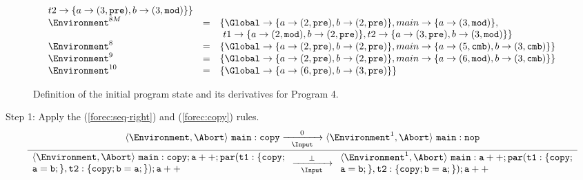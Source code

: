 \begin{figure}
$$\begin{array}{l l l}
									t2 \to \lbrace a \to (3, \mathtt{pre}), b \to (3, \mathtt{mod}) \rbrace
								\rbrace	\\
		\Environment^{8M}	&=& \lbrace
									\Global \to \lbrace a \to (2, \mathtt{pre}), b \to (2, \mathtt{pre}) \rbrace, 
									main \to \lbrace a \to (3, \mathtt{mod}) \rbrace,	\\
							& &	  ~ t1 \to \lbrace a \to (2, \mathtt{mod}), b \to (2, \mathtt{pre}) \rbrace,
									t2 \to \lbrace a \to (3, \mathtt{pre}), b \to (3, \mathtt{mod}) \rbrace
								\rbrace	\\
		\Environment^8		&=& \lbrace
									\Global \to \lbrace a \to (2, \mathtt{pre}), b \to (2, \mathtt{pre}) \rbrace, 
									main \to \lbrace a \to (5, \mathtt{cmb}), b \to (3, \mathtt{cmb}) \rbrace
								\rbrace	\\
		\Environment^9		&=& \lbrace
									\Global \to \lbrace a \to (2, \mathtt{pre}), b \to (2, \mathtt{pre}) \rbrace, 
									main \to \lbrace a \to (6, \mathtt{mod}), b \to (3, \mathtt{cmb}) \rbrace
								\rbrace	\\
		\Environment^{10}	&=& \lbrace
									\Global \to \lbrace a \to (6, \mathtt{pre}), b \to (3, \mathtt{pre}) \rbrace
								\rbrace	\\
	\end{array}$$
	
	\caption{Definition of the initial program state and its derivatives for Program 4.}
	\label{figure:forec_program_4}
\end{figure}

\noindent
Step 1: Apply the (\ref{forec:seq-right}) and (\ref{forec:copy}) rules. 
\begin{equation*}
	\frac{
			\langle \Environment, \Abort \rangle ~ \mathtt{main: copy}
				\xrightarrow[~~\Input~~]{0} 
			\langle \Environment^1, \Abort \rangle ~ \mathtt{main: nop}
		}{
			\begin{array}{l}
				\langle \Environment, \Abort \rangle ~ \mathtt{main: copy; a++; par(t1:\{copy;}	\\
				\mathtt{a=b;\},t2:\{copy; b=a;\}); a++}											\\
			\end{array}
				\xrightarrow[~~\Input~~]{\bot} 
			\begin{array}{l}
				\langle \Environment^1, \Abort \rangle ~ \mathtt{main: a++; par(t1:\{copy;}		\\
				\mathtt{a=b;\},t2:\{copy; b=a;\}); a++}											\\
			\end{array}
		}
\end{equation*}

